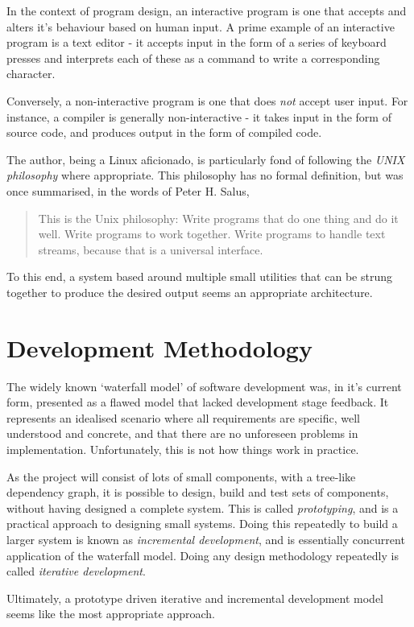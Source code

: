 \documentclass[10pt,a4paper,notitlepage]{report}
\begin{document}
In the context of program design, an interactive program is one that accepts and alters it's behaviour based on human input.
A prime example of an interactive program is a text editor - it accepts input in the form of a series of keyboard presses and interprets each of these as a command to write a corresponding character.

Conversely, a non-interactive program is one that does \emph{not} accept user input. For instance, a compiler is generally non-interactive - it takes input in the form of source code, and produces output in the form of compiled code.

The author, being a Linux aficionado, is particularly fond of following the \emph{UNIX philosophy} where appropriate. This philosophy has no formal definition, but was once summarised, in the words of Peter H. Salus\cite{qcou},
\begin{quote}
This is the Unix philosophy: Write programs that do one thing and do it well. Write programs to work together. Write programs to handle text streams, because that is a universal interface.
\end{quote}

To this end, a system based around multiple small utilities that can be strung together to produce the desired output seems an appropriate architecture.

\section{Development Methodology}
The widely known `waterfall model' of software development was, in it's current form, presented as a flawed model that lacked development stage feedback\cite{wwr-waterfall-notes}. It represents an idealised scenario where all requirements are specific, well understood and concrete, and that there are no unforeseen problems in implementation. Unfortunately, this is not how things work in practice.

As the project will consist of lots of small components, with a tree-like dependency graph, it is possible to design, build and test sets of components, without having designed a complete system. This is called \emph{prototyping}, and is a practical approach to designing small systems.
Doing this repeatedly to build a larger system is known as \emph{incremental development}, and is essentially concurrent application of the waterfall model. Doing any design methodology repeatedly is called \emph{iterative development}.

Ultimately, a prototype driven iterative and incremental development model seems like the most appropriate approach.
\end{document}
